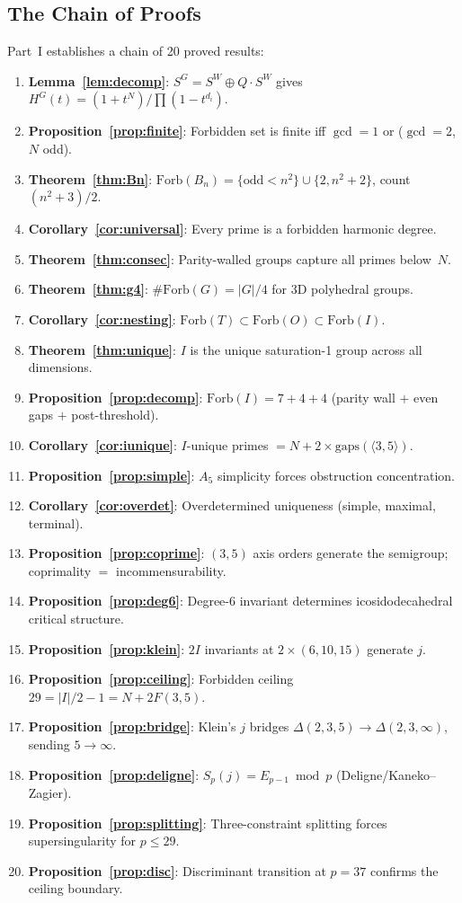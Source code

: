 \documentclass[11pt,letterpaper]{article}
\theoremstyle{definition}
\newcommand{\Forb}{\mathrm{Forb}}
\newcommand{\abs}[1]{\lvert #1 \rvert}
\newcommand{\gen}[1]{\langle #1 \rangle}
\begin{document}
\subsection{The Chain of Proofs}
Part~I establishes a chain of 20 proved results:
\begin{enumerate}[label=\arabic*.,leftmargin=2em]
  \item \textbf{Lemma~\ref{lem:decomp}}: $S^G=S^W\oplus Q\cdot S^W$ gives $H^G(t)=(1+t^N)/\prod(1-t^{d_i})$.
  \item \textbf{Proposition~\ref{prop:finite}}: Forbidden set is finite iff $\gcd=1$ or ($\gcd=2$, $N$ odd).
  \item \textbf{Theorem~\ref{thm:Bn}}: $\Forb(B_n)=\{\text{odd}<n^2\}\cup\{2,n^2{+}2\}$, count $(n^2{+}3)/2$.
  \item \textbf{Corollary~\ref{cor:universal}}: Every prime is a forbidden harmonic degree.
  \item \textbf{Theorem~\ref{thm:consec}}: Parity-walled groups capture all primes below~$N$.
  \item \textbf{Theorem~\ref{thm:g4}}: $\#\Forb(G)=\abs{G}/4$ for 3D polyhedral groups.
  \item \textbf{Corollary~\ref{cor:nesting}}: $\Forb(T)\subset\Forb(O)\subset\Forb(I)$.
  \item \textbf{Theorem~\ref{thm:unique}}: $I$ is the unique saturation-1 group across all dimensions.
  \item \textbf{Proposition~\ref{prop:decomp}}: $\Forb(I)=7+4+4$ (parity wall $+$ even gaps $+$ post-threshold).
  \item \textbf{Corollary~\ref{cor:iunique}}: $I$-unique primes $=N+2\times\mathrm{gaps}(\gen{3,5})$.
  \item \textbf{Proposition~\ref{prop:simple}}: $A_5$ simplicity forces obstruction concentration.
  \item \textbf{Corollary~\ref{cor:overdet}}: Overdetermined uniqueness (simple, maximal, terminal).
  \item \textbf{Proposition~\ref{prop:coprime}}: $(3,5)$ axis orders generate the semigroup; coprimality $=$ incommensurability.
  \item \textbf{Proposition~\ref{prop:deg6}}: Degree-6 invariant determines icosidodecahedral critical structure.
  \item \textbf{Proposition~\ref{prop:klein}}: $2I$ invariants at $2\times(6,10,15)$ generate $j$.
  \item \textbf{Proposition~\ref{prop:ceiling}}: Forbidden ceiling $29 = \abs{I}/2-1 = N+2F(3,5)$.
  \item \textbf{Proposition~\ref{prop:bridge}}: Klein's $j$ bridges $\Delta(2,3,5)\to\Delta(2,3,\infty)$, sending $5\to\infty$.
  \item \textbf{Proposition~\ref{prop:deligne}}: $S_p(j)=E_{p-1}\bmod p$ (Deligne/Kaneko--Zagier).
  \item \textbf{Proposition~\ref{prop:splitting}}: Three-constraint splitting forces supersingularity for $p\le 29$.
  \item \textbf{Proposition~\ref{prop:disc}}: Discriminant transition at $p=37$ confirms the ceiling boundary.
\end{enumerate}
\end{document}
